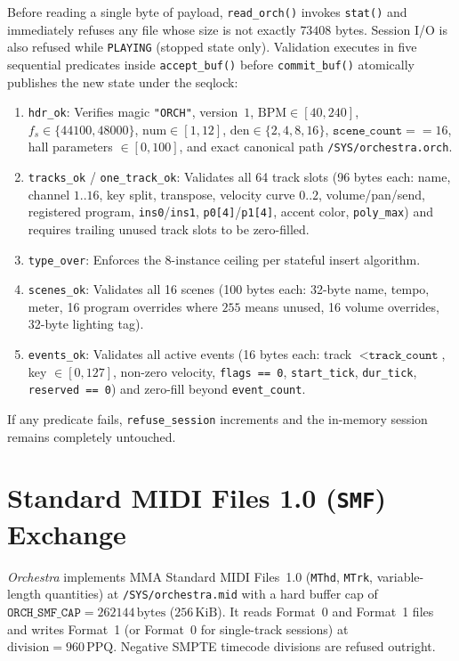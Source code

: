Before reading a single byte of payload, \texttt{read\_orch()} invokes \texttt{stat()} and immediately refuses any file whose size is not exactly $73408$ bytes. Session I/O is also refused while \texttt{PLAYING} (stopped state only). Validation executes in five sequential predicates inside \texttt{accept\_buf()} before \texttt{commit\_buf()} atomically publishes the new state under the seqlock:
\begin{enumerate}[leftmargin=1.5em]
  \item \texttt{hdr\_ok}: Verifies magic \texttt{"ORCH"}, version~$1$, $\mathrm{BPM} \in [40, 240]$, $f_s \in \{44100, 48000\}$, $\mathrm{num} \in [1, 12]$, $\mathrm{den} \in \{2, 4, 8, 16\}$, $\texttt{scene\_count} == 16$, hall parameters $\in [0, 100]$, and exact canonical path \texttt{/SYS/orchestra.orch}.
  \item \texttt{tracks\_ok} / \texttt{one\_track\_ok}: Validates all 64 track slots (96 bytes each: name, channel $1..16$, key split, transpose, velocity curve $0..2$, volume/pan/send, registered program, \texttt{ins0}/\texttt{ins1}, \texttt{p0[4]}/\texttt{p1[4]}, accent color, \texttt{poly\_max}) and requires trailing unused track slots to be zero-filled.
  \item \texttt{type\_over}: Enforces the 8-instance ceiling per stateful insert algorithm.
  \item \texttt{scenes\_ok}: Validates all 16 scenes (100 bytes each: 32-byte name, tempo, meter, 16 program overrides where $255$ means unused, 16 volume overrides, 32-byte lighting tag).
  \item \texttt{events\_ok}: Validates all active events (16 bytes each: track $< \texttt{track\_count}$, key $\in [0, 127]$, non-zero velocity, \texttt{flags == 0}, \texttt{start\_tick}, \texttt{dur\_tick}, \texttt{reserved == 0}) and zero-fill beyond \texttt{event\_count}.
\end{enumerate}

If any predicate fails, \texttt{refuse\_session} increments and the in-memory session remains completely untouched.

\section{Standard MIDI Files 1.0 (\texttt{SMF}) Exchange}

\emph{Orchestra} implements MMA Standard MIDI Files~1.0 (\texttt{MThd}, \texttt{MTrk}, variable-length quantities) at \texttt{/SYS/orchestra.mid} with a hard buffer cap of $\texttt{ORCH\_SMF\_CAP} = 262144\,\text{bytes}$ ($256\,\text{KiB}$). It reads Format~0 and Format~1 files and writes Format~1 (or Format~0 for single-track sessions) at $\mathrm{division} = 960\,\mathrm{PPQ}$. Negative SMPTE timecode divisions are refused outright.

